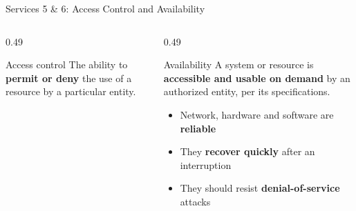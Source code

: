 \documentclass[aspectratio=169,11pt,xcolor={table}]{beamer}
\begin{document}
\begin{frame}{Services 5 \& 6: Access Control and Availability}
  \begin{columns}[T]
    \begin{column}{0.49\textwidth}
      \begin{block}{Access control}
        \small The ability to \textbf{permit or deny} the use of a resource by a particular entity.
      \end{block}
      \centering
    \end{column}
    \begin{column}{0.49\textwidth}
      \begin{alertblock}{Availability}
        \small A system or resource is \textbf{accessible and usable on demand} by an authorized entity, per its specifications.
      \end{alertblock}
      \begin{itemize}\small\setlength{\itemsep}{3pt}
        \item Network, hardware and software are \textbf{reliable}
        \item They \textbf{recover quickly} after an interruption
        \item They should resist \textbf{denial-of-service} attacks
      \end{itemize}
    \end{column}
  \end{columns}
\end{frame}
\end{document}
